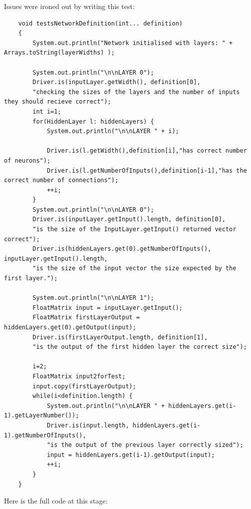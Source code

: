 \documentclass[11pt]{article} %
\begin{document}
Issues were ironed  out by writing this test: 

\begin{lstlisting}
    void testsNetworkDefinition(int... definition)
    {
        System.out.println("Network initialised with layers: " + Arrays.toString(layerWidths) );
       
        System.out.println("\n\nLAYER 0");
        Driver.is(inputLayer.getWidth(), definition[0],
        "checking the sizes of the layers and the number of inputs they should recieve correct");
        int i=1;
        for(HiddenLayer l: hiddenLayers) {
            System.out.println("\n\nLAYER " + i);

            Driver.is(l.getWidth(),definition[i],"has correct number of neurons");
            Driver.is(l.getNumberOfInputs(),definition[i-1],"has the correct number of connections");
            ++i;
        }
        System.out.println("\n\nLAYER 0");
        Driver.is(inputLayer.getInput().length, definition[0],
        "is the size of the InputLayer.getInput() returned vector correct");
        Driver.is(hiddenLayers.get(0).getNumberOfInputs(), inputLayer.getInput().length,
        "is the size of the input vector the size expected by the first layer.");
        
        System.out.println("\n\nLAYER 1");
        FloatMatrix input = inputLayer.getInput();
        FloatMatrix firstLayerOutput = hiddenLayers.get(0).getOutput(input);
        Driver.is(firstLayerOutput.length, definition[1],
        "is the output of the first hidden layer the correct size");
        
        i=2;
        FloatMatrix input2forTest;
        input.copy(firstLayerOutput);
        while(i<definition.length) {
            System.out.println("\n\nLAYER " + hiddenLayers.get(i-1).getLayerNumber());
            Driver.is(input.length, hiddenLayers.get(i-1).getNumberOfInputs(),
            "is the output of the previous layer correctly sized");
            input = hiddenLayers.get(i-1).getOutput(input);
            ++i;
        }
    }

\end{lstlisting}

Here is the full code at this stage:
\end{document}
